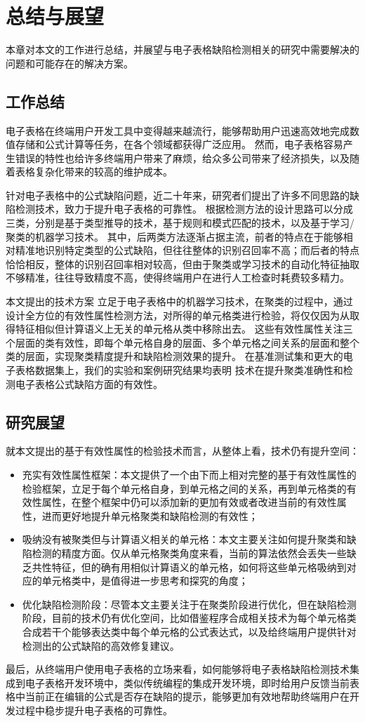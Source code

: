 \chapter{总结与展望}
本章对本文的工作进行总结，并展望与电子表格缺陷检测相关的研究中需要解决的问题和可能存在的解决方案。


\section{工作总结}
电子表格在终端用户开发工具中变得越来越流行，能够帮助用户迅速高效地完成数值存储和公式计算等任务，在各个领域都获得广泛应用。
然而，电子表格容易产生错误的特性也给许多终端用户带来了麻烦，给众多公司带来了经济损失，以及随着表格复杂化带来的较高的维护成本。

针对电子表格中的公式缺陷问题，近二十年来，研究者们提出了许多不同思路的缺陷检测技术，致力于提升电子表格的可靠性。
根据检测方法的设计思路可以分成三类，分别是基于类型推导的技术，基于规则和模式匹配的技术，以及基于学习/聚类的机器学习技术。
其中，后两类方法逐渐占据主流，前者的特点在于能够相对精准地识别特定类型的公式缺陷，但往往整体的识别召回率不高；而后者的特点恰恰相反，整体的识别召回率相对较高，但由于聚类或学习技术的自动化特征抽取不够精准，往往导致精度不高，使得终端用户在进行人工检查时耗费较多精力。

本文提出的技术方案 \wa 立足于电子表格中的机器学习技术\cu，在聚类的过程中，通过设计全方位的有效性属性检测方法，对所得的单元格类进行检验，将仅仅因为从取得特征相似但计算语义上无关的单元格从类中移除出去。
这些有效性属性关注三个层面的类有效性，即每个单元格自身的层面、多个单元格之间关系的层面和整个类的层面，实现聚类精度提升和缺陷检测效果的提升。
在基准测试集和更大的电子表格数据集上，我们的实验和案例研究结果均表明 \wa 技术在提升聚类准确性和检测电子表格公式缺陷方面的有效性。


\section{研究展望}
就本文提出的基于有效性属性的检验技术而言，从整体上看，\wa 技术仍有提升空间：
\begin{itemize}
    \item 充实有效性属性框架：本文提供了一个由下而上相对完整的基于有效性属性的检验框架，立足于每个单元格自身，到单元格之间的关系，再到单元格类的有效性属性，在整个框架中仍可以添加新的更加有效或者改进当前的有效性属性，进而更好地提升单元格聚类和缺陷检测的有效性；
    \item 吸纳没有被聚类但与计算语义相关的单元格：本文主要关注如何提升聚类和缺陷检测的精度方面。仅从单元格聚类角度来看，当前的算法依然会丢失一些缺乏共性特征，但的确有用相似计算语义的单元格，如何将这些单元格吸纳到对应的单元格类中，是值得进一步思考和探究的角度；
    \item 优化缺陷检测阶段：尽管本文主要关注于在聚类阶段进行优化，但在缺陷检测阶段，目前的技术仍有优化空间，比如借鉴程序合成相关技术为每个单元格类合成若干个能够表达类中每个单元格的公式表达式，以及给终端用户提供针对检测出的公式缺陷的高效修复建议。
\end{itemize}

最后，从终端用户使用电子表格的立场来看，如何能够将电子表格缺陷检测技术集成到电子表格开发环境中，类似传统编程的集成开发环境，即时给用户反馈当前表格中当前正在编辑的公式是否存在缺陷的提示，能够更加有效地帮助终端用户在开发过程中稳步提升电子表格的可靠性。
